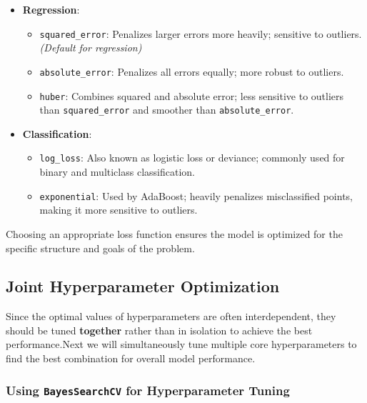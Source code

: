\documentclass[
  letterpaper,
  DIV=11,
  numbers=noendperiod]{scrreprt}
\providecommand{\tightlist}{%
  \setlength{\itemsep}{0pt}\setlength{\parskip}{0pt}}\usepackage{longtable,booktabs,array}
\begin{document}
\begin{itemize}
\tightlist
\item
  \textbf{Regression}:

  \begin{itemize}
  \tightlist
  \item
    \texttt{squared\_error}: Penalizes larger errors more heavily;
    sensitive to outliers. \emph{(Default for regression)}
  \item
    \texttt{absolute\_error}: Penalizes all errors equally; more robust
    to outliers.
  \item
    \texttt{huber}: Combines squared and absolute error; less sensitive
    to outliers than \texttt{squared\_error} and smoother than
    \texttt{absolute\_error}.
  \end{itemize}
\item
  \textbf{Classification}:

  \begin{itemize}
  \tightlist
  \item
    \texttt{log\_loss}: Also known as logistic loss or deviance;
    commonly used for binary and multiclass classification.
  \item
    \texttt{exponential}: Used by AdaBoost; heavily penalizes
    misclassified points, making it more sensitive to outliers.
  \end{itemize}
\end{itemize}

Choosing an appropriate loss function ensures the model is optimized for
the specific structure and goals of the problem.

\subsection{Joint Hyperparameter
Optimization}\label{joint-hyperparameter-optimization}

Since the optimal values of hyperparameters are often interdependent,
they should be tuned \textbf{together} rather than in isolation to
achieve the best performance.Next we will simultaneously tune multiple
core hyperparameters to find the best combination for overall model
performance.

\subsubsection{\texorpdfstring{Using \texttt{BayesSearchCV} for
Hyperparameter
Tuning}{Using BayesSearchCV for Hyperparameter Tuning}}\label{using-bayessearchcv-for-hyperparameter-tuning}
\end{document}
